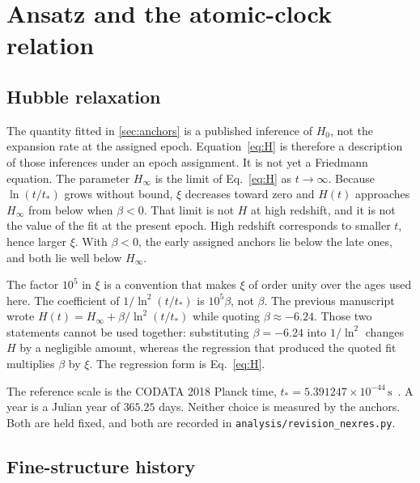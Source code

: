 \section{Ansatz and the atomic-clock relation}
\label{sec:ansatz}

\subsection{Hubble relaxation}
\label{sec:hubble-ansatz}

The quantity fitted in \cref{sec:anchors} is a published inference of $H_{0}$, not the expansion rate at the assigned epoch.
Equation~\eqref{eq:H} is therefore a description of those inferences under an epoch assignment.
It is not yet a Friedmann equation.
The parameter $H_{\infty}$ is the limit of Eq.~\eqref{eq:H} as $t\to\infty$.
Because $\ln(t/t_{*})$ grows without bound, $\xi$ decreases toward zero and $H(t)$ approaches $H_{\infty}$ from below when $\beta<0$.
That limit is not $H$ at high redshift, and it is not the value of the fit at the present epoch.
High redshift corresponds to smaller $t$, hence larger $\xi$.
With $\beta<0$, the early assigned anchors lie below the late ones, and both lie well below $H_{\infty}$.

The factor $10^{5}$ in $\xi$ is a convention that makes $\xi$ of order unity over the ages used here.
The coefficient of $1/\ln^{2}(t/t_{*})$ is $10^{5}\beta$, not $\beta$.
The previous manuscript wrote $H(t)=H_{\infty}+\beta/\ln^{2}(t/t_{*})$ while quoting $\beta\approx-6.24$.
Those two statements cannot be used together: substituting $\beta=-6.24$ into $1/\ln^{2}$ changes $H$ by a negligible amount, whereas the regression that produced the quoted fit multiplies $\beta$ by $\xi$.
The regression form is Eq.~\eqref{eq:H}.

The reference scale is the CODATA 2018 Planck time,
$t_{*}=5.391247\times10^{-44}\,\mathrm{s}$~\citep{Tiesinga2021}.
A year is a Julian year of $365.25$ days.
Neither choice is measured by the anchors.
Both are held fixed, and both are recorded in \texttt{analysis/revision\_nexres.py}.

\subsection{Fine-structure history}
\label{sec:alpha-ansatz}

